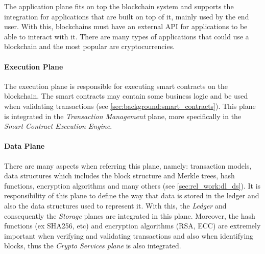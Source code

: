 The application plane fits on top the blockchain system and supports the integration for applications that are built on top of it, mainly used by the end user. With this, blockchains must have an external API for applications to be able to interact with it. There are many types of applications that could use a blockchain and the most popular are cryptocurrencies.

\paragraph{Execution Plane}

The execution plane is responsible for executing smart contracts on the blockchain. The smart contracts may contain some business logic and be used when validating transactions (see \ref{sec:background:smart_contracts}). This plane is integrated in the \textit{Transaction Management} plane, more specifically in the \textit{Smart Contract Execution Engine}.

\paragraph{Data Plane}

There are many aspects when referring this plane, namely: transaction models, %
data structures which includes the block structure and Merkle trees, hash functions, encryption algorithms and many others (see \ref{sec:rel_work:dl_ds}). It is responsibility of this plane to define the way that data is stored in the ledger and also the data structures used to represent it. With this, the \textit{Ledger}  and consequently the \textit{Storage} planes are integrated in this plane. Moreover, the hash functions (ex SHA256, etc) and encryption algorithms (RSA, ECC) are extremely important when verifying and validating transactions and also when identifying blocks, thus the \textit{Crypto Services plane} is also integrated. %

